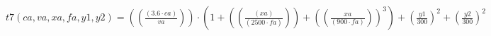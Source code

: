 \documentclass[preview,border=1pt]{standalone}
\begin{document}
$
t7 (ca,va,xa,fa,y1,y2) = \left(\left(\frac{\left(\num{3.6}\cdot ca\right)}{va}\right)\right)\cdot \left(\num{1}+\left(\left(\frac{\left(xa\right)}{\left(\num{2500}\cdot fa\right)}\right)\right)+\left(\left(\frac{xa}{\left(\num{900}\cdot fa\right)}\right)\right)^{\num{3}}\right)+\left(\frac{y1}{\num{300}}\right)^{\num{2}}+\left(\frac{y2}{\num{300}}\right)^{\num{2}}
$
\end{document}
